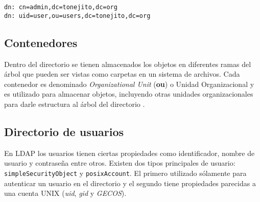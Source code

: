 {
\normalsize
\linespread{1}
\begin{center}
  \texttt{dn: cn=admin,dc=tonejito,dc=org}
  \\
  \texttt{dn: uid=user,ou=users,dc=tonejito,dc=org}
\end{center}
}

  \subsection{Contenedores}

Dentro del directorio se tienen almacenados los objetos en diferentes ramas del \'{a}rbol que pueden ser vistas como carpetas en un sistema de archivos. Cada contenedor es denominado \textit{Organizational Unit} (\textbf{ou}) o Unidad Organizacional y es utilizado para almacenar objetos, incluyendo otras unidades organizacionales para darle estructura al \'{a}rbol del directorio \cite{_appendix_????}.


  \subsection {Directorio de usuarios}

En \textsc{LDAP}  los usuarios tienen ciertas propiedades como identificador, nombre de usuario y contrase\~{n}a entre otros. Existen dos tipos principales de usuario: \texttt{simpleSecurityObject} y \texttt{posixAccount}. El primero utilizado s\'{o}lamente para autenticar un usuario en el directorio y el segundo tiene propiedades parecidas a una cuenta \textsc{UNIX} (\textit{uid}, \textit{gid} y \textit{GECOS}).



